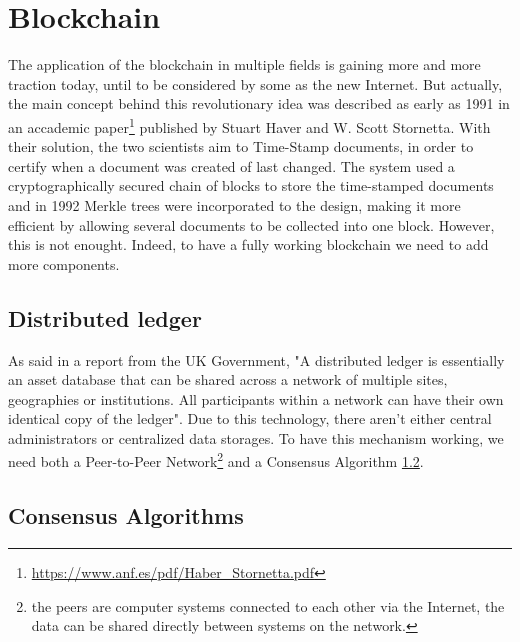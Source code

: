\chapter{Blockchain}
\label{cha:blockchain}

The application of the blockchain in multiple fields is gaining more and more 
traction today, until to be considered by some as the new Internet.
But actually, the main concept behind this revolutionary idea was described as 
early as 1991 in an accademic paper\footnote{\url{https://www.anf.es/pdf/Haber_Stornetta.pdf}}
published by Stuart Haver and W. Scott Stornetta. With their solution, the two 
scientists aim to Time-Stamp documents, in order to certify when a document
was created of last changed. The system used a cryptographically secured 
chain of blocks to store the time-stamped documents and in 1992 Merkle 
trees were incorporated to the design, making it more efficient by 
allowing several documents to be collected into one block.\cite{binancevision}
However, this is not enought. Indeed, to have a fully working blockchain 
we need to add more components.




\section{Distributed ledger}
\label{sec:ledger}

As said in a report from the UK Government, "A distributed ledger is 
essentially an asset database that can be shared across a network of 
multiple sites, geographies or institutions. All participants within a 
network can have their own identical copy of the ledger"\cite{ukgov}.
Due to this technology, there aren't either central administrators or 
centralized data storages. To have this mechanism working, we need both
a Peer-to-Peer Network\footnote{the peers are computer systems connected
to each other via the Internet, the data can be shared directly between 
systems on the network.} and a Consensus Algorithm \ref{sec:consensus}. 

\section{Consensus Algorithms}
\label{sec:consensus}

